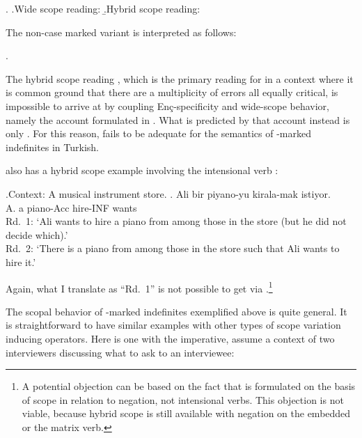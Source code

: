 \documentclass[11pt,a4paper]{article}
\newcommand{\encspec}{Enç-specific}
\begin{document}
\ex. 
\a.\label{excondawide}Wide scope reading:
\b.\label{excondanar}Hybrid scope reading:


The non-case marked variant  is interpreted as follows:

\ex. 


The hybrid scope reading , which is the primary reading
for  in a context where it is common ground that there are
a multiplicity of errors all equally critical, is impossible to arrive
at by coupling \encspec{}ity and wide-scope behavior, namely the
account formulated in . What is predicted by
that account instead is only . For this reason,
 fails to be adequate for the semantics of
\acc-marked indefinites in Turkish.

 also has a hybrid scope example involving the intensional verb
:

\ex.Context: A musical instrument store.
\ag. Ali bir piyano-yu kirala-mak istiyor.\\
A. a piano-Acc hire-INF wants\\
Rd.\ 1: `Ali wants to hire a piano from among those in the store (but he did not decide which).'\\
Rd.\ 2: `There is a piano from among those in the store such that Ali wants to hire it.'

Again, what I translate as ``Rd.\ 1'' is not possible to get via
.\footnote{A potential objection can be
		based on the fact that  is formulated on
		the basis of scope in relation to negation, not intensional
verbs. This objection is not viable, because hybrid scope is
still available with negation on the embedded or the matrix verb.}

The scopal behavior of \acc-marked indefinites exemplified above is
quite general. It is straightforward to have similar examples with
other types of scope variation inducing operators. Here is one with
the imperative, assume a context of two interviewers discussing what
to ask to an interviewee:
\end{document}
